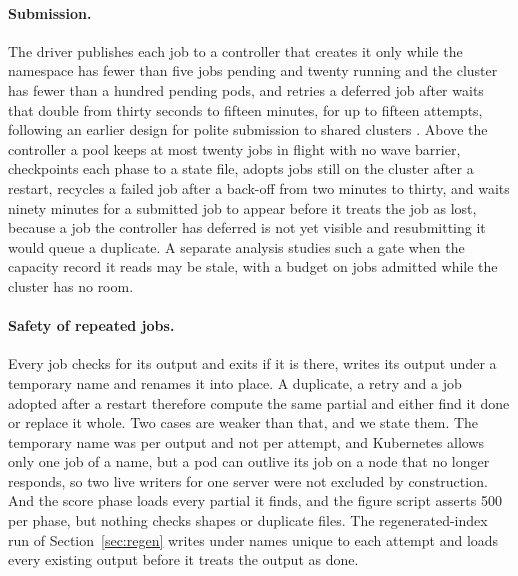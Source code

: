 \documentclass[sigconf, nonacm]{acmart}
\begin{document}
\paragraph{Submission.} The driver publishes each job to a controller \cite{natsbursting} that
creates it only while the namespace has fewer than five jobs pending and twenty running and the
cluster has fewer than a hundred pending pods, and retries a deferred job after waits that double
from thirty seconds to fifteen minutes, for up to fifteen attempts, following an earlier design for
polite submission to shared clusters \cite{politesubmit}. Above the controller a pool keeps at most
twenty jobs in flight with no wave barrier, checkpoints each phase to a state file, adopts jobs
still on the cluster after a restart, recycles a failed job after a back-off from two minutes to
thirty, and waits ninety minutes for a submitted job to appear before it treats the job as lost,
because a job the controller has deferred is not yet visible and resubmitting it would queue a
duplicate. A separate analysis \cite{politeburst} studies such a gate when the capacity record it
reads may be stale, with a budget on jobs admitted while the cluster has no room.

\paragraph{Safety of repeated jobs.} Every job checks for its output and exits if it is there,
writes its output under a temporary name and renames it into place. A duplicate, a retry and a job adopted after a restart therefore
compute the same partial and either find it done or replace it whole. Two cases are weaker than
that, and we state them. The temporary name was per output and not per attempt, and Kubernetes
allows only one job of a name, but a pod can outlive its job on a node that no longer responds, so
two live writers for one server were not excluded by construction. And the score phase loads every
partial it finds, and the figure script asserts 500 per phase, but nothing checks shapes or
duplicate files. The
regenerated-index run of Section~\ref{sec:regen} writes under names unique to each attempt and
loads every existing output before it treats the output as done.
\end{document}

